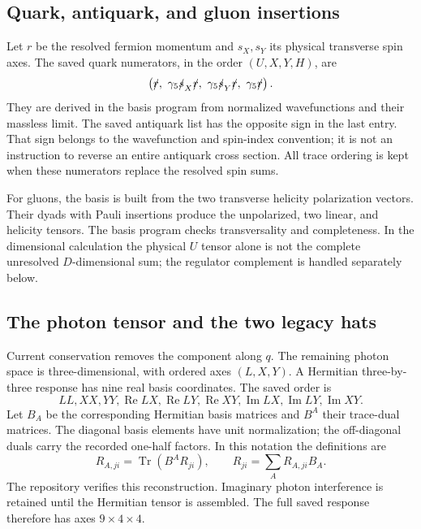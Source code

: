 \documentclass[11pt,a4paper]{article}
\newcommand{\tr}{\operatorname{Tr}}
\begin{document}
\subsection{Quark, antiquark, and gluon insertions}
Let $r$ be the resolved fermion momentum and $s_X,s_Y$ its physical transverse spin axes. The saved quark numerators, in the order $(U,X,Y,H)$, are
\begin{equation}
 \left(\slashed r,\ \gamma_5\slashed s_X\slashed r,
 \ \gamma_5\slashed s_Y\slashed r,\ \gamma_5\slashed r\right).
\end{equation}
They are derived in the basis program from normalized wavefunctions and their massless limit. The saved antiquark list has the opposite sign in the last entry. That sign belongs to the wavefunction and spin-index convention; it is not an instruction to reverse an entire antiquark cross section. All trace ordering is kept when these numerators replace the resolved spin sums.

For gluons, the basis is built from the two transverse helicity polarization vectors. Their dyads with Pauli insertions produce the unpolarized, two linear, and helicity tensors. The basis program checks transversality and completeness. In the dimensional calculation the physical $U$ tensor alone is not the complete unresolved $D$-dimensional sum; the regulator complement is handled separately below.

\subsection{The photon tensor and the two legacy hats}
Current conservation removes the component along $q$. The remaining photon space is three-dimensional, with ordered axes $(L,X,Y)$. A Hermitian three-by-three response has nine real basis coordinates. The saved order is
\begin{equation}
 LL,XX,YY,\operatorname{Re}LX,\operatorname{Re}LY,\operatorname{Re}XY,
 \operatorname{Im}LX,\operatorname{Im}LY,\operatorname{Im}XY.
\end{equation}
Let $B_A$ be the corresponding Hermitian basis matrices and $B^A$ their trace-dual matrices. The diagonal basis elements have unit normalization; the off-diagonal duals carry the recorded one-half factors. In this notation the definitions are
\begin{equation}
 R_{A,ji}=\tr(B^A R_{ji}),\qquad R_{ji}=\sum_A R_{A,ji}B_A.
\end{equation}
The repository verifies this reconstruction. Imaginary photon interference is retained until the Hermitian tensor is assembled. The full saved response therefore has axes $9\times4\times4$.
\end{document}
